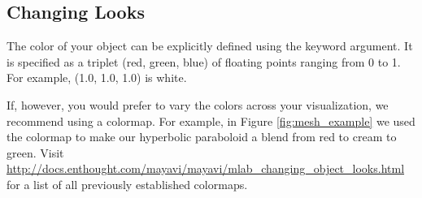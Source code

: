 \subsection*{Changing Looks}
The color of your object can be explicitly defined using the  keyword argument.
It is specified as a triplet (red, green, blue) of floating points ranging from 0 to 1.
For example, (1.0, 1.0, 1.0) is white.

If, however, you would prefer to vary the colors across your visualization, we recommend using a colormap.
For example, in Figure \ref{fig:mesh_example} we used the colormap  to make our hyperbolic paraboloid a blend from red to cream to green.
Visit \url{http://docs.enthought.com/mayavi/mayavi/mlab_changing_object_looks.html} for a list of all previously established colormaps.

